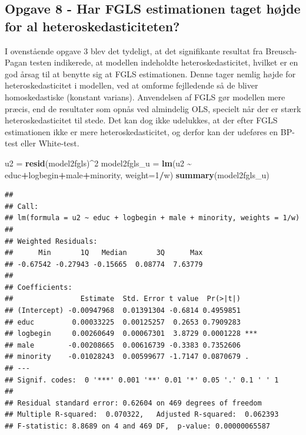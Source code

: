 \documentclass[
]{article}
\newenvironment{Shaded}{\begin{snugshade}}{\end{snugshade}}
\newcommand{\AttributeTok}[1]{\textcolor[rgb]{0.13,0.29,0.53}{#1}}
\newcommand{\DecValTok}[1]{\textcolor[rgb]{0.00,0.00,0.81}{#1}}
\newcommand{\FunctionTok}[1]{\textcolor[rgb]{0.13,0.29,0.53}{\textbf{#1}}}
\newcommand{\NormalTok}[1]{#1}
\newcommand{\OtherTok}[1]{\textcolor[rgb]{0.56,0.35,0.01}{#1}}
\newcommand{\SpecialCharTok}[1]{\textcolor[rgb]{0.81,0.36,0.00}{\textbf{#1}}}
\begin{document}
\hypertarget{opgave-8---har-fgls-estimationen-taget-huxf8jde-for-al-heteroskedasticiteten}{%
\subsection{Opgave 8 - Har FGLS estimationen taget højde for al
heteroskedasticiteten?}\label{opgave-8---har-fgls-estimationen-taget-huxf8jde-for-al-heteroskedasticiteten}}

I ovenstående opgave 3 blev det tydeligt, at det signifikante resultat
fra Breusch-Pagan testen indikerede, at modellen indeholdte
heteroskedasticitet, hvilket er en god årsag til at benytte sig at FGLS
estimationen. Denne tager nemlig højde for heteroskedasticitet i
modellen, ved at omforme fejlledende så de bliver homoskedastiske
(konstant varians). Anvendelsen af FGLS gør modellen mere præcis, end de
resultater som opnås ved almindelig OLS, specielt når der er stærk
heteroskedasticitet til stede. Det kan dog ikke udelukkes, at der efter
FGLS estimationen ikke er mere heteroskedasticitet, og derfor kan der
udeføres en BP-test eller White-test.

\begin{Shaded}
\begin{Highlighting}[]
\NormalTok{u2 }\OtherTok{=} \FunctionTok{resid}\NormalTok{(model2fgls)}\SpecialCharTok{\^{}}\DecValTok{2}
\NormalTok{model2fgls\_u }\OtherTok{=} \FunctionTok{lm}\NormalTok{(u2 }\SpecialCharTok{\textasciitilde{}}\NormalTok{ educ}\SpecialCharTok{+}\NormalTok{logbegin}\SpecialCharTok{+}\NormalTok{male}\SpecialCharTok{+}\NormalTok{minority, }\AttributeTok{weight=}\DecValTok{1}\SpecialCharTok{/}\NormalTok{w)}
\FunctionTok{summary}\NormalTok{(model2fgls\_u)}
\end{Highlighting}
\end{Shaded}

\begin{verbatim}
## 
## Call:
## lm(formula = u2 ~ educ + logbegin + male + minority, weights = 1/w)
## 
## Weighted Residuals:
##      Min       1Q   Median       3Q      Max 
## -0.67542 -0.27943 -0.15665  0.08774  7.63779 
## 
## Coefficients:
##                Estimate  Std. Error t value  Pr(>|t|)    
## (Intercept) -0.00947968  0.01391304 -0.6814 0.4959851    
## educ         0.00033225  0.00125257  0.2653 0.7909283    
## logbegin     0.00260649  0.00067301  3.8729 0.0001228 ***
## male        -0.00208665  0.00616739 -0.3383 0.7352606    
## minority    -0.01028243  0.00599677 -1.7147 0.0870679 .  
## ---
## Signif. codes:  0 '***' 0.001 '**' 0.01 '*' 0.05 '.' 0.1 ' ' 1
## 
## Residual standard error: 0.62604 on 469 degrees of freedom
## Multiple R-squared:  0.070322,   Adjusted R-squared:  0.062393 
## F-statistic: 8.8689 on 4 and 469 DF,  p-value: 0.00000065587
\end{verbatim}
\end{document}

